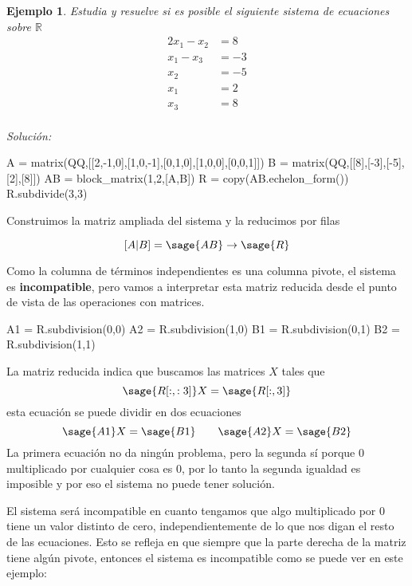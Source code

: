 \documentclass{amsart}
\newtheorem{ejem}{Ejemplo}
\def\r{\mathbb{R}}
\begin{document}
\begin{ejem} Estudia y resuelve si es posible el siguiente sistema de 
ecuaciones sobre $\r $
\begin{align*}
2 x_{1} - x_{2} &= 8 \\
x_{1} - x_{3} &= -3 \\
x_{2} &= -5 \\
x_{1} &= 2 \\
x_{3} &= 8 \\
\end{align*}
\end{ejem}

{\it Solución:}


\begin{sageblock}
A = matrix(QQ,[[2,-1,0],[1,0,-1],[0,1,0],[1,0,0],[0,0,1]])
B = matrix(QQ,[[8],[-3],[-5],[2],[8]])
AB = block_matrix(1,2,[A,B])
R = copy(AB.echelon_form())
R.subdivide(3,3)
\end{sageblock}

Construimos la matriz ampliada del sistema y la reducimos por filas

\[[A|B] = \sage{AB} \to \sage{R} \]

Como la columna de términos independientes es una columna pivote, el 
sistema es {\bf incompatible}, pero vamos a interpretar esta matriz reducida
desde el punto de vista de las operaciones con matrices.

\begin{sageblock}
A1 = R.subdivision(0,0)
A2 = R.subdivision(1,0)
B1 = R.subdivision(0,1)
B2 = R.subdivision(1,1)
\end{sageblock}

La matriz reducida indica que buscamos las matrices $X$ tales que
\[ \sage{R[:,:3]} X = \sage{R[:,3]} \]
esta ecuación se puede dividir en dos ecuaciones
\[ \sage{A1} X = \sage{B1} \qquad \sage{A2} X = \sage{B2}\]
La primera ecuación no da ningún problema, pero la segunda sí porque 
$0$ multiplicado por cualquier cosa es $0$, por lo tanto la segunda 
igualdad es imposible y por eso el sistema no puede tener solución.


El sistema será incompatible en cuanto tengamos que algo multiplicado
por $0$ tiene un valor distinto de cero, independientemente de lo que
nos digan el resto de las ecuaciones. Esto se refleja en que siempre
que la parte derecha de la matriz tiene algún pivote, entonces el sistema
es incompatible como se puede ver en este ejemplo:
\end{document}
